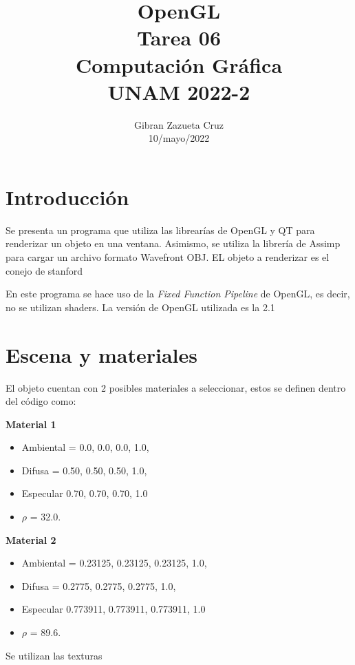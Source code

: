 \documentclass[12pt]{article}
\title{%
  OpenGL\\
  \large Tarea 06 \\
    \Large Computación Gráfica\\
     \large UNAM 2022-2}
\author{Gibran Zazueta Cruz \\
\small 10/mayo/2022}
\date{}
\begin{document}
\maketitle

\section{Introducción}

Se presenta un programa que utiliza las librearías de OpenGL y QT para renderizar un objeto en una ventana. Asimismo, se utiliza la librería de Assimp para cargar un archivo formato Wavefront OBJ. EL objeto a renderizar es el conejo de stanford

En este programa se hace uso de la \textit{Fixed Function Pipeline} de OpenGL, es decir, no se utilizan shaders. La versión de OpenGL utilizada es la 2.1

\section{Escena y materiales}

El objeto cuentan con 2 posibles materiales a seleccionar, estos se definen dentro del código como:

\textbf{Material 1}
\begin{itemize}
\item Ambiental = {0.0, 0.0, 0.0, 1.0},
\item Difusa = {0.50, 0.50, 0.50, 1.0},
\item Especular {0.70, 0.70, 0.70, 1.0} 
\item $\rho$ = 32.0.
\end{itemize}


\textbf{Material 2}
\begin{itemize}
\item Ambiental = {0.23125, 0.23125, 0.23125, 1.0},
\item Difusa = {0.2775, 0.2775, 0.2775, 1.0},
\item Especular {0.773911, 0.773911, 0.773911, 1.0}
\item $\rho$ = 89.6.
\end{itemize}


Se utilizan las texturas
\end{document}
